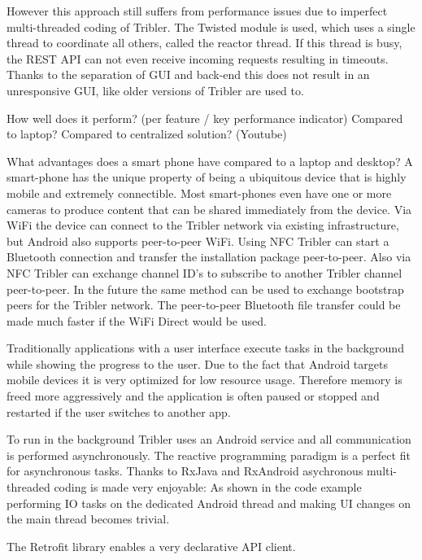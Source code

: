 
However this approach still suffers from performance issues due to imperfect multi-threaded coding of Tribler.
The Twisted module is used, which uses a single thread to coordinate all others, called the reactor thread.
If this thread is busy, the REST API can not even receive incoming requests resulting in timeouts.
Thanks to the separation of GUI and back-end this does not result in an unresponsive GUI, like older versions of Tribler are used to.


How well does it perform? (per feature / key performance indicator)
Compared to laptop?
Compared to centralized solution? (Youtube)



What advantages does a smart phone have compared to a laptop and desktop?
A smart-phone has the unique property of being a ubiquitous device that is highly mobile and extremely connectible.
Most smart-phones even have one or more cameras to produce content that can be shared immediately from the device.
Via WiFi the device can connect to the Tribler network via existing infrastructure, but Android also supports peer-to-peer WiFi.
Using NFC Tribler can start a Bluetooth connection and transfer the installation package peer-to-peer.
Also via NFC Tribler can exchange channel ID's to subscribe to another Tribler channel peer-to-peer.
In the future the same method can be used to exchange bootstrap peers for the Tribler network.
The peer-to-peer Bluetooth file transfer could be made much faster if the WiFi Direct would be used.


Traditionally applications with a user interface execute tasks in the background while showing the progress to the user.
Due to the fact that Android targets mobile devices it is very optimized for low resource usage.
Therefore memory is freed more aggressively and the application is often paused or stopped and restarted if the user switches to another app.

To run in the background Tribler uses an Android service and all communication is performed asynchronously.
The reactive programming paradigm is a perfect fit for asynchronous tasks.
Thanks to RxJava and RxAndroid asychronous multi-threaded coding is made very enjoyable:
As shown in the code example performing IO tasks on the dedicated Android thread and making UI changes on the main thread becomes trivial.

The Retrofit library enables a very declarative API client.


